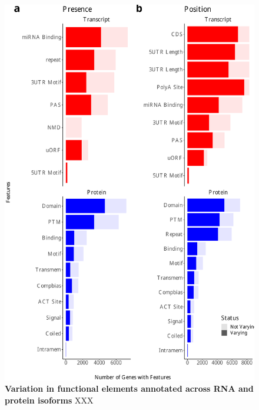 \begin{figure}[!htp]
	\centering
	\includegraphics[page=2,trim={3cm 7cm 3cm 4cm},scale = 0.6]{Figures/WholeFDA.pdf}
	\captionsetup{width=0.95\textwidth}
	\caption[Variation in functional elements annotated across RNA and protein isoforms]%
	{\textbf{Variation in functional elements annotated across RNA and protein isoforms} XXX}   
	\label{fig:FDA_whole}
\end{figure}


